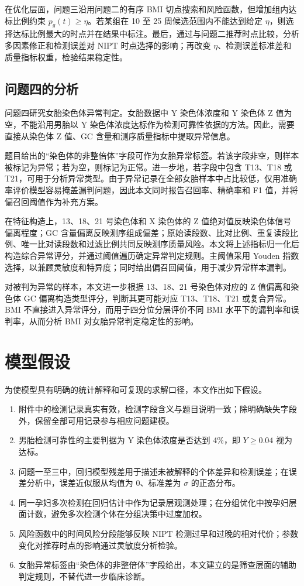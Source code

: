 \documentclass[UTF8,zihao=-4]{ctexart}
\numberwithin{equation}{section}
\begin{document}
在优化层面，问题三沿用问题二的有序 BMI 切点搜索和风险函数，但增加组内达标比例约束 $p_g(t)\ge \eta$。若某组在 10 至 25 周候选范围内不能达到给定 $\eta$，则选择达标比例最大的时点并在结果中标注。最后，通过与问题二推荐时点比较，分析多因素修正和检测误差对 NIPT 时点选择的影响；再改变 $\eta$、检测误差标准差和质量指标权重，检验结果稳定性。

\subsection{问题四的分析}

问题四研究女胎染色体异常判定。女胎数据中 Y 染色体浓度和 Y 染色体 Z 值为空，不能沿用男胎以 Y 染色体浓度达标作为检测可靠性依据的方法。因此，需要直接从染色体 Z 值、GC 含量和测序质量指标中提取异常信息。

题目给出的“染色体的非整倍体”字段可作为女胎异常标签。若该字段非空，则样本被标记为异常；若为空，则标记为正常。进一步地，若字段中包含 T13、T18 或 T21，可用于分析异常类型。由于异常记录在全部女胎样本中占比较低，仅用准确率评价模型容易掩盖漏判问题，因此本文同时报告召回率、精确率和 F1 值，并将偏召回阈值作为补充方案。

在特征构造上，13、18、21 号染色体和 X 染色体的 Z 值绝对值反映染色体信号偏离程度；GC 含量偏离反映测序组成偏差；原始读段数、比对比例、重复读段比例、唯一比对读段数和过滤比例共同反映测序质量风险。本文将上述指标归一化后构造综合异常评分，并通过阈值遍历确定异常判定规则。主阈值采用 Youden 指数选择，以兼顾灵敏度和特异度；同时给出偏召回阈值，用于减少异常样本漏判。

对被判为异常的样本，本文进一步根据 13、18、21 号染色体对应的 Z 值偏离和染色体 GC 偏离构造类型评分，判断其更可能对应 T13、T18、T21 或复合异常。BMI 不直接进入异常评分，而用于四分位分层评价不同 BMI 水平下的漏判率和误判率，从而分析 BMI 对女胎异常判定稳定性的影响。

\section{模型假设}

为使模型具有明确的统计解释和可复现的求解口径，本文作出如下假设。

\begin{enumerate}
  \item 附件中的检测记录真实有效，检测字段含义与题目说明一致；除明确缺失字段外，保留全部可用记录参与相应问题建模。
  \item 男胎检测可靠性的主要判据为 Y 染色体浓度是否达到 4\%，即 $Y\ge 0.04$ 视为达标。
  \item 问题一至三中，回归模型残差用于描述未被解释的个体差异和检测误差；在误差分析中，误差近似服从均值为 0、标准差为 $\sigma$ 的正态分布。
  \item 同一孕妇多次检测在回归估计中作为记录层观测处理；在分组优化中按孕妇层面计数，避免多次检测个体在分组决策中过度加权。
  \item 风险函数中的时间风险分段能够反映 NIPT 检测过早和过晚的相对代价；参数变化对推荐时点的影响通过灵敏度分析检验。
  \item 女胎异常标签由“染色体的非整倍体”字段给出，本文建立的是筛查层面的辅助判定规则，不替代进一步临床诊断。
\end{enumerate}
\end{document}
